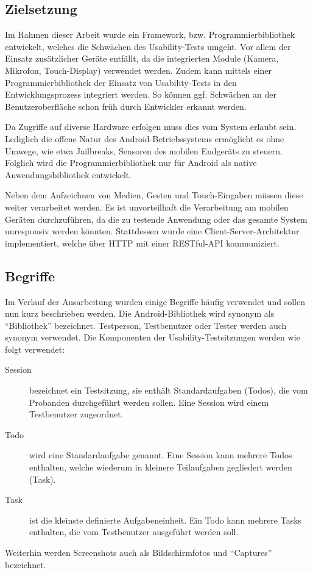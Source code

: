 \subsection{Zielsetzung \label{sec: zielsetzung}}

Im Rahmen dieser Arbeit wurde ein Framework, bzw. Programmierbibliothek entwickelt, welches die Schwächen des Usability-Tests umgeht. 
Vor allem der Einsatz zusätzlicher Geräte entfällt, da die integrierten Module (Kamera, Mikrofon, Touch-Display) verwendet werden. 
Zudem kann mittels einer Programmierbibliothek der Einsatz von Usability-Tests in den Entwicklungsprozess integriert werden. 
So können ggf. Schwächen an der Benutzeroberfläche schon früh durch Entwickler erkannt werden.

Da Zugriffe auf diverse Hardware erfolgen muss dies vom System erlaubt sein. 
Lediglich die offene Natur des Android-Betriebssystems ermöglicht es ohne Umwege, wie etwa Jailbreaks, Sensoren des mobilen Endgeräts zu steuern. 
Folglich wird die Programmierbibliothek nur für Android als native Anwendungsbibliothek entwickelt. 

Neben dem Aufzeichnen von Medien, Gesten und Touch-Eingaben müssen diese weiter verarbeitet werden. 
Es ist unvorteilhaft die Verarbeitung am mobilen Geräten durchzuführen, da die zu testende Anwendung oder das gesamte System unresponsiv werden könnten. 
Stattdessen wurde eine Client-Server-Architektur implementiert, welche über \ac{HTTP} mit einer RESTful-API kommuniziert. 

\subsection{Begriffe}
Im Verlauf der Ausarbeitung wurden einige Begriffe häufig verwendet und sollen nun kurz beschrieben werden.
Die Android-Bibliothek wird synonym als \enquote{Bibliothek} bezeichnet.
Testperson, Testbenutzer oder Tester werden auch synonym verwendet.
Die Komponenten der Usability-Testsitzungen werden wie folgt verwendet:
\begin{description}
	\item[Session] bezeichnet ein Testsitzung, sie enthält Standardaufgaben (Todos), die vom Probanden durchgeführt werden sollen. Eine Session wird einem Testbenutzer zugeordnet.
	\item[Todo] wird eine Standardaufgabe genannt. Eine Session kann mehrere Todos enthalten, welche wiederum in kleinere Teilaufgaben gegliedert werden (Task).
	\item[Task] ist die kleinste definierte Aufgabeneinheit. Ein Todo kann mehrere Tasks enthalten, die vom Testbenutzer ausgeführt werden soll.
\end{description}
Weiterhin werden Screenshots auch als Bildschirmfotos und \enquote{Captures} bezeichnet. 
